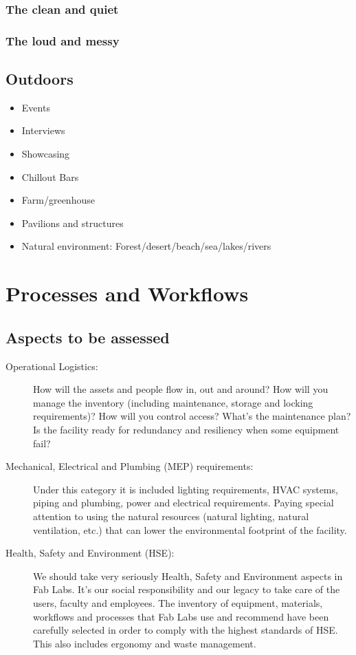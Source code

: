 \documentclass[a4paper,12pt,titlepage]{article}
\begin{document}
\subsubsection{The clean and quiet}

\subsubsection{The loud and messy} 


\subsection{Outdoors}
\begin{itemize}
\item Events
\item Interviews
\item Showcasing
\item Chillout Bars
\item Farm/greenhouse
\item Pavilions and structures
\item Natural environment: Forest/desert/beach/sea/lakes/rivers
\end{itemize}

\clearpage  
\section{Processes and Workflows}

\subsection{Aspects to be assessed}
\begin{description}
\item [Operational Logistics:] How will the assets and people flow in, out and around? How will you manage the inventory (including maintenance, storage and locking requirements)? How will you control access? What's the maintenance plan? Is the facility ready for redundancy and resiliency when some equipment fail?

\item [Mechanical, Electrical and Plumbing (MEP) requirements:] Under this category it is included lighting requirements, HVAC systems, piping and plumbing, power and electrical requirements. Paying special attention to using the natural resources (natural lighting, natural ventilation, etc.) that can lower the environmental footprint of the facility.

\item [Health, Safety and Environment (HSE):] We should take very seriously Health, Safety and Environment aspects in Fab Labs. It's our social responsibility and our legacy to take care of the users, faculty and employees.
The inventory of equipment, materials, workflows and processes that Fab Labs use and recommend have been
carefully selected in order to comply with the highest standards of HSE. This also includes ergonomy and waste management.
\end{description}
\end{document}
